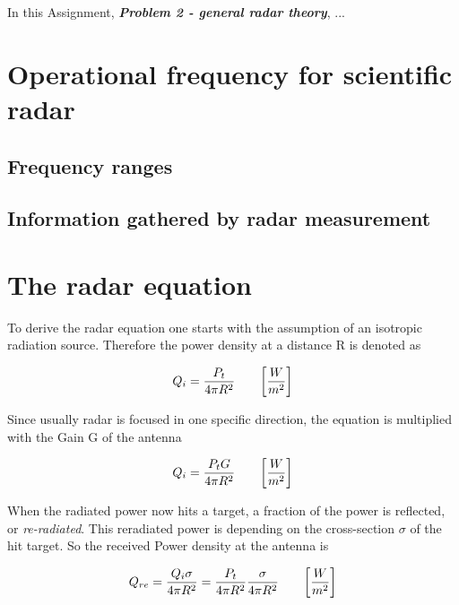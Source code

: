 

In this Assignment, \textit{\textbf{Problem 2 - general radar theory}}, ...


\section{Operational frequency for scientific radar}


\subsection{Frequency ranges}


\subsection{Information gathered by radar measurement}



\section{The radar equation}
To derive the radar equation one starts with the assumption of an isotropic radiation source. Therefore the power density at a distance R is denoted as


\begin{equation}
\label{eq:iso}
	\centering
	Q_{i} = \frac{P_t}{4 \pi R^2} \qquad \bigg[\frac{W}{m^2} \bigg]
\end{equation}

Since usually radar is focused in one specific direction, the equation is multiplied with the Gain G of the antenna

\begin{equation}
\label{eq:dir}
	\centering
	Q_{i} = \frac{P_t G}{4 \pi R^2} \qquad \bigg[\frac{W}{m^2} \bigg]
\end{equation}

When the radiated power now hits a target, a fraction of the power is reflected, or \textit{re-radiated}. This reradiated power is depending on the cross-section $\sigma$ of the hit target. So the received Power density at the antenna is 

\begin{equation}
\label{eq:rePowDen}
	\centering
	Q_{re} = \frac{Q_i \sigma}{4\pi R^2} = \frac{P_t}{4 \pi R^2} \frac{\sigma}{4\pi R^2} \qquad \bigg[\frac{W}{m^2} \bigg]
\end{equation}

